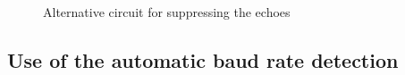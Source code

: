 \begin{figure}[H]
\centering
{}
\caption{Alternative circuit for suppressing the echoes}
\label{fig:onewire2}
\end{figure}


\subsection{Use of the automatic baud rate detection}
\label{sec:autobaud}

